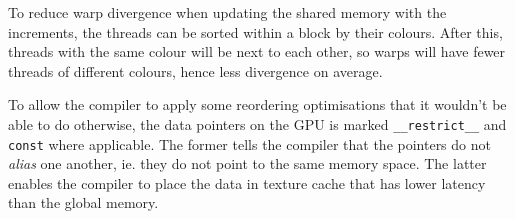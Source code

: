 To reduce warp divergence when updating the shared memory with the increments,
the threads can be sorted within a block by their colours. After this, threads
with the same colour will be next to each other, so warps will have fewer threads
of different colours, hence less divergence on average.

To allow the compiler to apply some reordering optimisations that it wouldn't be
able to do otherwise, the data pointers on the GPU is marked
\lstinline!__restrict__! and \lstinline!const! where applicable. The former
tells the compiler that the pointers do not \emph{alias} one another, ie. they
do not point to the same memory space. The latter enables the compiler to place
the data in texture cache that has lower latency than the global memory.

